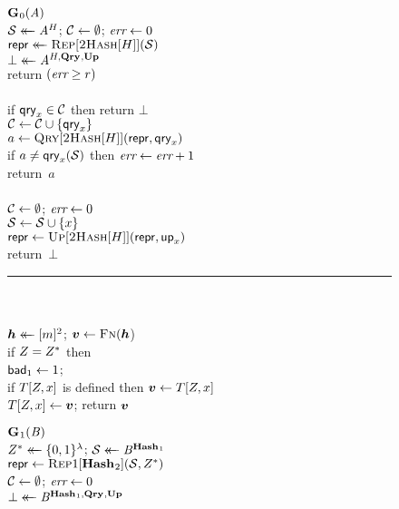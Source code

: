 \begin{figure}
  {
    \underline{$\G_0(\advA)$}\\[2pt]
      $\col \getsr \advA^H$; $\setC \gets \emptyset$; $\err \gets 0$\\
      $\pub \getsr \Rep[\hashbf[H]](\col)$\\
      $\bot \getsr \advA^{H,\QRYO,\UPO}$\\
      return $(\err \geq r)$
    \\[6pt]
    \\[2pt]
      if $\qry_x \in \mathcal{C}$ then return $\bot$\\
      $\setC \gets \setC \union \{\qry_x\}$\\
      $a \gets \Qry[\hashbf[H]](\pub, \qry_x)$\\
      if $a \neq \qry_x(\col)$ then $\err \gets \err + 1$\\
      return~$a$
    \\[6pt]
    \\[2pt]
      $\setC \gets \emptyset$; $\err \gets 0$\\
      $\col \gets \col \union \{x\}$\\
      $\pub \gets \Up[\hashbf[H]](\pub,\up_x)$\\
      return~$\bot$
    \\[4pt]
    \hspace*{-4pt}\rule{1.043\textwidth}{.4pt}
    \\[5pt]
     \hfill{}\hspace*{3pt}\\
      $\hh \getsr [m]^2$; $\vv \gets \fff(\hh$)\\
      if $\salt = \salt^*$ then\\
      \tab $\bad_1 \gets 1$; \\
      if $T[\salt,x]$ is defined then $\vv \gets T[\salt,x]$\\
      $T[\salt,x] \gets \vv$;
      return $\vv$
  }
  {
    \underline{$\G_1(\advB)$}\\[2pt]
      $\salt^* \getsr \bits^\lambda$;
      $\col \getsr \advB^{\HASHO_1}$\\
      $\pub \gets \Repx[\HASHO_2](\col, \salt^*)$\\
      $\setC \gets \emptyset$;
      $\err \gets 0$\\
      $\bot \getsr \advB^{\HASHO_1,\QRYO,\UPO}$\\
}
\end{figure}
